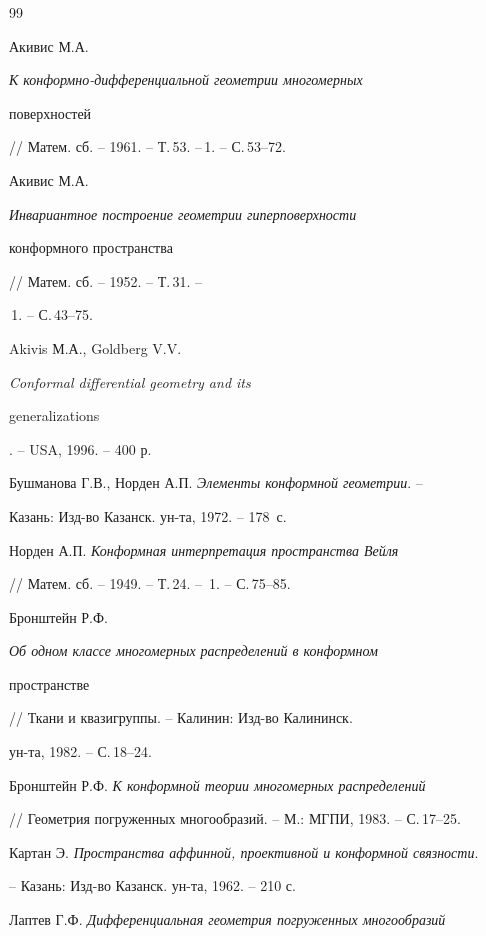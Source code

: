 \begin{thebibliography}{99} 


 




Акивис М.А. {\em К конформно-дифференциальной геометрии многомерных 


поверхностей} // Матем. сб. -- 1961. -- Т.\,53. --\No\,1. -- С.\,53--72. 




Акивис М.А. {\em Инвариантное построение геометрии гиперповерхности 


конформного пространства} // Матем. сб. -- 1952. -- Т.\,31. -- 


\No\,1. -- С.\,43--75. 




Akivis М.А., Goldberg V.V. {\em Conformal differential geometry and its 


generalizations}. -- USA, 1996. -- 400 р. 




Бушманова Г.В., Норден А.П. {\em Элементы конформной геометрии}. -- 


Казань: Изд-во Казанск. ун-та, 1972. -- 178~с. 




Норден А.П. {\em Конформная интерпретация пространства Вейля} 


// Матем. сб. -- 1949. -- Т.\,24. -- \No\,1. -- С.\,75--85. 




Бронштейн Р.Ф. {\em Об одном классе многомерных распределений в конформном 


пространстве} // Ткани и квазигруппы. -- Калинин: Изд-во Калининск. 


ун-та, 1982. -- С.\,18--24. 




Бронштейн Р.Ф. {\em К конформной теории многомерных распределений} 


// Геометрия погруженных многообразий. -- М.: МГПИ, 1983. -- С.\,17--25. 




Картан Э. {\em Пространства аффинной, проективной и конформной связности}. 


-- Казань: Изд-во Казанск. ун-та, 1962. -- 210 с. 




Лаптев Г.Ф. {\em Дифференциальная геометрия погруженных многообразий} 



\end{thebibliography}
